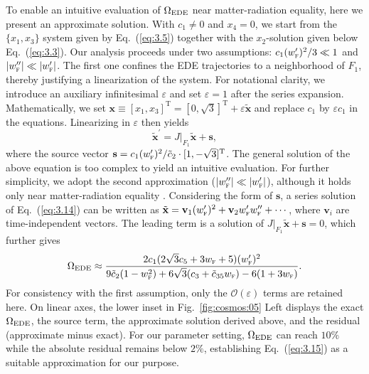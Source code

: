 \documentclass[aps,prd,twocolumn]{revtex4-2}
\newcommand\subEDE{{\rm EDE}}
\newcommand\subF{\textsc{f}}
\begin{document}
To enable an intuitive evaluation of $\Omega_\subEDE$ near matter-radiation equality, here we present an approximate solution. With $c_1\neq0$ and $x_4=0$, we start from the $\{x_1,x_3\}$ system given by Eq.~(\ref{eq:3.5}) together with the $x_2$-solution given below Eq.~(\ref{eq:3.3}). Our analysis proceeds under two assumptions: $c_1(w_\subF^\prime)^2/3\ll1$ and $|w_\subF^{\prime\prime}|\ll|w_\subF^\prime|$. The first one confines the EDE trajectories to a neighborhood of $F_1$, thereby justifying a linearization of the system. For notational clarity, we introduce an auxiliary infinitesimal $\varepsilon$ and set $\varepsilon=1$ after the series expansion. Mathematically, we set $\mathbf{x}\equiv[x_1,x_3]^\mathrm{T}=[0,\sqrt{3}]^\mathrm{T}+\varepsilon\tilde{\mathbf{x}}$ and replace $c_1$ by $\varepsilon c_1$ in the equations. Linearizing in $\varepsilon$ then yields
\begin{equation}\label{eq:3.14}
  \tilde{\mathbf{x}}^\prime = J|_{F_1} \tilde{\mathbf{x}} + \mathbf{s},
\end{equation}
where the source vector $\mathbf{s}=c_1(w_\subF^\prime)^2/\tilde{c}_2\cdot[1,-\sqrt{3}]^\mathrm{T}$. The general solution of the above equation is too complex to yield an intuitive evaluation. For further simplicity, we adopt the second approximation ($|w_\subF^{\prime\prime}|\ll|w_\subF^\prime|$), although it holds only near matter-radiation equality \cite{NotShown}. Considering the form of $\mathbf{s}$, a series solution of Eq.~(\ref{eq:3.14}) can be written as $\tilde{\mathbf{x}}=\mathbf{v}_1(w_\subF^\prime)^2+\mathbf{v}_2w_\subF^\prime w_\subF^{\prime\prime}+\cdots$, where $\mathbf{v}_i$ are time-independent vectors. The leading term is a solution of $J|_{F_1} \tilde{\mathbf{x}} + \mathbf{s}=0$, which further gives
\begin{equation}\label{eq:3.15}
  \Omega_\subEDE \approx \frac{2c_1(2\sqrt{3}c_5+3w_\subF+5)(w_\subF^\prime)^2} {9\tilde{c}_2(1-w_\subF^2)+6\sqrt{3}(c_3+\tilde{c}_{35}w_\subF)-6(1+3w_\subF)}.
\end{equation}
For consistency with the first assumption, only the $\mathcal{O}(\varepsilon)$ terms are retained here. On linear axes, the lower inset in Fig.~\ref{fig:cosmos:05} Left displays the exact $\Omega_\subEDE$, the source term, the approximate solution derived above, and the residual (approximate minus exact). For our parameter setting, $\Omega_\subEDE$ can reach $10\%$ while the absolute residual remains below $2\%$, establishing Eq.~(\ref{eq:3.15}) as a suitable approximation for our purpose. 
\end{document}
